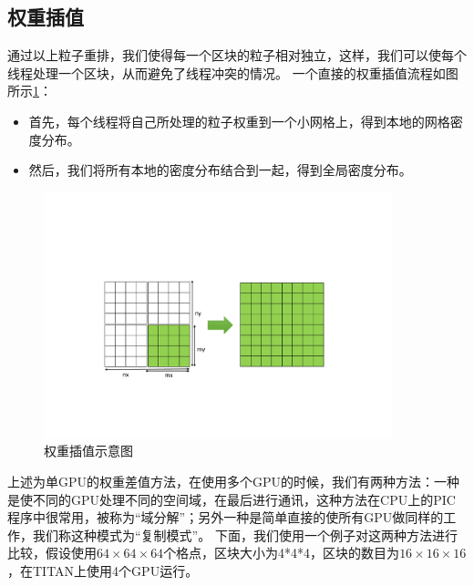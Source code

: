 \subsection{权重插值}
\label{section:PIC_GPU_depositor}
通过以上粒子重排，我们使得每一个区块的粒子相对独立，这样，我们可以使每个线程处理一个区块，从而避免了线程冲突的情况。
一个直接的权重插值流程如图所示\ref{fig:PIC_combine}：
\begin{itemize}
  \item 首先，每个线程将自己所处理的粒子权重到一个小网格上，得到本地的网格密度分布。
  \item 然后，我们将所有本地的密度分布结合到一起，得到全局密度分布。
\end{itemize}
\begin{figure}[!htb]
    \centering
    \includegraphics[width=0.9\textwidth]{Img/3PIC_combine.pdf}
    \caption{权重插值示意图}
    \label{fig:PIC_combine}
\end{figure}

上述为单GPU的权重差值方法，在使用多个GPU的时候，我们有两种方法：一种是使不同的GPU处理不同的空间域，在最后进行通讯，这种方法在CPU上的PIC程序中很常用，被称为“域分解”；另外一种是简单直接的使所有GPU做同样的工作，我们称这种模式为“复制模式”。
下面，我们使用一个例子对这两种方法进行比较，假设使用$64 \times 64 \times 64$个格点，区块大小为4*4*4，区块的数目为$16 \times 16 \times 16$，在TITAN上使用4个GPU运行。

